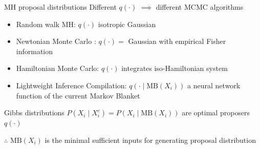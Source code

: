 \documentclass[12pt]{beamer}
\begin{document}
\begin{frame}[fragile]{MH proposal distributions}
    Different $q(\cdot)$ $\implies$ different MCMC algorithms
    
    \begin{itemize}
        \item<+-> Random walk MH: $q(\cdot)$ isotropic Gaussian
        \item<+-> Newtonian Monte Carlo \cite{arora2020newtonian}: $q(\cdot) =$ Gaussian
            with empirical Fisher information
        \item<+-> Hamiltonian Monte Carlo: $q(\cdot)$ integrates iso-Hamiltonian system
        \item<+-> Lightweight Inference Compilation: $q(\cdot \mid \text{MB}(X_i))$ a neural network
            function of the current Markov Blanket
    \end{itemize}

    \onslide<+->
    \begin{theorem}
        Gibbs distributions $P(X_i \mid X_i^c) = P(X_i \mid \text{MB}(X_i))$
        are optimal proposers $q(\cdot)$
    \end{theorem}

    \onslide<+->
    $\therefore$ $\text{MB}(X_i)$ is the minimal sufficient inputs for generating proposal distribution
\end{frame}
\end{document}
